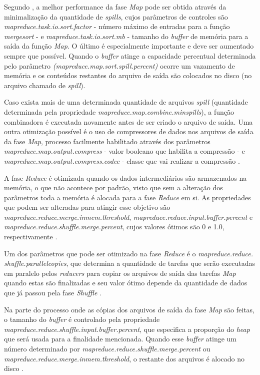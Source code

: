 Segundo \textcite{HadoopBook15}, a melhor performance da fase \textit{Map} pode ser obtida através da minimalização da quantidade de \textit{spills}, cujos parâmetros de controles são \textit{mapreduce.task.io.sort.factor} - número máximo de entradas para a função \textit{\gls{mergesort}} - e \textit{mapreduce.task.io.sort.mb} - tamanho do \textit{\gls{buffer}} de memória para a saída da função \textit{Map}. O último é especialmente importante e deve ser aumentado sempre que possível. Quando o \textit{\gls{buffer}} atinge a capacidade percentual determinada pelo parâmetro \textit{(mapreduce.map.sort.spill.percent)} ocorre um vazamento de memória e os conteúdos restantes do arquivo de saída são colocados no disco (no arquivo chamado de \textit{spill}).

Caso exista mais de uma determinada quantidade de arquivos \textit{spill} (quantidade determinada pela propriedade \textit{mapreduce.map.combine.minspills}), a função combinadora é executada novamente antes de ser criado o arquivo de saída. Uma outra otimização possível é o uso de compressores de dados nos arquivos de saída da fase \textit{Map}, processo facilmente habilitado através dos parâmetros \textit{mapreduce.map.output.compress} - valor booleano que habilita a compressão - e \textit{mapreduce.map.output.compress.codec} - classe que vai realizar a compressão \cite{HadoopBook15}.

A fase \textit{Reduce} é otimizada quando os dados intermediários são armazenados na memória, o que não acontece por padrão, visto que sem a alteração dos parâmetros toda a memória é alocada para a fase \textit{Reduce} em si. As propriedades que podem ser alteradas para atingir esse objetivo são \textit{mapreduce.reduce.merge.inmem.threshold}, \textit{mapreduce.reduce.input.buffer.percent} e \textit{mapreduce.reduce.shuffle.merge.percent}, cujos valores ótimos são 0 e 1.0, respectivamente \cite{HadoopBook15}.

Um dos parâmetros que pode ser otimizado na fase \textit{Reduce} é o \textit{mapreduce.reduce. shuffle.parallelcopies}, que determina a quantidade de tarefas que serão executadas em paralelo pelos \textit{reducers} para copiar os arquivos de saída das tarefas \textit{Map} quando estas são finalizadas e seu valor ótimo depende da quantidade de dados que já passou pela fase \textit{Shuffle} \cite{MRONLINELi14}.

Na parte do processo onde as cópias dos arquivos de saída da fase \textit{Map} são feitas, o tamanho do \textit{\gls{buffer}} é controlado pela propriedade \textit{mapreduce.reduce.shuffle.input.buffer.percent}, que especifica a proporção do \textit{\gls{heap}} que será usada para a finalidade mencionada. Quando esse \textit{\gls{buffer}} atinge um número determinado por \textit{mapreduce.reduce.shuffle.merge.percent} ou \textit{mapreduce.reduce.merge.inmem.threshold}, o restante dos arquivos é alocado no disco \cite{HadoopBook15}.

